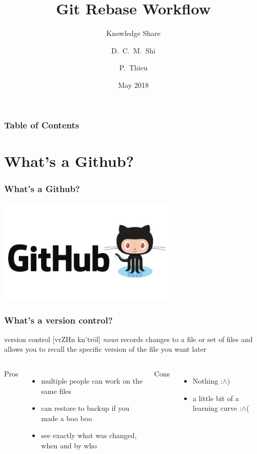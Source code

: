 \documentclass{beamer}
\title[Git Rebase Workflow] %
{Git Rebase Workflow}
\subtitle{Knowledge Share}
\author[David Shi, Phong Thieu] %
{D.~C.~M.~Shi\inst{1} \and P.~Thieu\inst{2}}
\institute[AdeptMind] %
{
  \inst{1}%
  Junior Intern\\
  AdeptMind
  \and
  \inst{2}%
  Technical Writer\\
  AdeptMind
}
\date[KS 2018] %
{May 2018}
\begin{document}
\frame{\titlepage}


\begin{frame}
\frametitle{Table of Contents}
\tableofcontents
\end{frame}

\section{What's a Github?}
\begin{frame}
\frametitle{What's a Github?}
\begin{center}
    \includegraphics[height=5cm]{pictures/github.jpg}
\end{center}
\end{frame}


\begin{frame}
\frametitle{What's a version control?}
\begin{block}{version control [v\textschwa rZH\textschwa n k\textschwa n'trōl] \textit{noun}}
records changes to a file or set of files and allows you to recall the specific version of the file you want later
\end{block}


    \pause \begin{columns}[T]
    Pros
    \begin{itemize}
    \item multiple people can work on the same files  
    \item can restore to backup if you made a boo boo
    \item see exactly what was changed, when and by who
    \end{itemize}
    \pause Cons
    \begin{itemize}
    \item Nothing :$\wedge$)
    \pause \item a little bit of a learning curve :$\wedge$(
    \end{itemize}
  \end{columns}

\end{frame}
\end{document}
